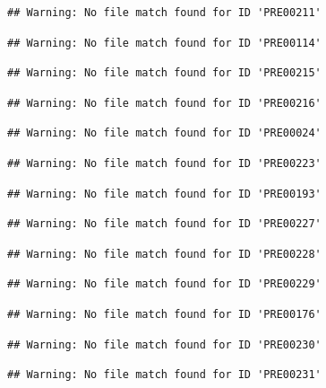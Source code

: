 \documentclass[
]{book}
\theoremstyle{definition}
\theoremstyle{definition}
\theoremstyle{definition}
\theoremstyle{definition}
\theoremstyle{remark}
\begin{document}
\begin{verbatim}
## Warning: No file match found for ID 'PRE00211'
\end{verbatim}

\begin{verbatim}
## Warning: No file match found for ID 'PRE00114'
\end{verbatim}

\begin{verbatim}
## Warning: No file match found for ID 'PRE00215'
\end{verbatim}

\begin{verbatim}
## Warning: No file match found for ID 'PRE00216'
\end{verbatim}

\begin{verbatim}
## Warning: No file match found for ID 'PRE00024'
\end{verbatim}

\begin{verbatim}
## Warning: No file match found for ID 'PRE00223'
\end{verbatim}

\begin{verbatim}
## Warning: No file match found for ID 'PRE00193'
\end{verbatim}

\begin{verbatim}
## Warning: No file match found for ID 'PRE00227'
\end{verbatim}

\begin{verbatim}
## Warning: No file match found for ID 'PRE00228'
\end{verbatim}

\begin{verbatim}
## Warning: No file match found for ID 'PRE00229'
\end{verbatim}

\begin{verbatim}
## Warning: No file match found for ID 'PRE00176'
\end{verbatim}

\begin{verbatim}
## Warning: No file match found for ID 'PRE00230'
\end{verbatim}

\begin{verbatim}
## Warning: No file match found for ID 'PRE00231'
\end{verbatim}
\end{document}

